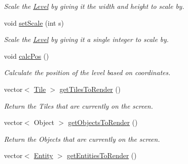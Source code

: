 \begin{DoxyCompactItemize}
\begin{DoxyCompactList}\small\item\em Scale the \hyperlink{classLevel}{Level} by giving it the width and height to scale by. \end{DoxyCompactList}\item 
void \hyperlink{classLevel_af6fe8bc2dd6623fcbaa739403a239d77}{set\+Scale} (int s)\hypertarget{classLevel_af6fe8bc2dd6623fcbaa739403a239d77}{}\label{classLevel_af6fe8bc2dd6623fcbaa739403a239d77}

\begin{DoxyCompactList}\small\item\em Scale the \hyperlink{classLevel}{Level} by giving it a single integer to scale by. \end{DoxyCompactList}\item 
void \hyperlink{classLevel_a02e915f95e181dcfe95553e923a73a39}{calc\+Pos} ()\hypertarget{classLevel_a02e915f95e181dcfe95553e923a73a39}{}\label{classLevel_a02e915f95e181dcfe95553e923a73a39}

\begin{DoxyCompactList}\small\item\em Calculate the position of the level based on coordinates. \end{DoxyCompactList}\item 
vector$<$ \hyperlink{classTile}{Tile} $>$ \hyperlink{classLevel_ade9e45f70f2f3f81c120bb161f87218f}{get\+Tiles\+To\+Render} ()\hypertarget{classLevel_ade9e45f70f2f3f81c120bb161f87218f}{}\label{classLevel_ade9e45f70f2f3f81c120bb161f87218f}

\begin{DoxyCompactList}\small\item\em Return the Tiles that are currently on the screen. \end{DoxyCompactList}\item 
vector$<$ Object $>$ \hyperlink{classLevel_a80d185e702151c5b5764c1cadcd9064d}{get\+Objects\+To\+Render} ()\hypertarget{classLevel_a80d185e702151c5b5764c1cadcd9064d}{}\label{classLevel_a80d185e702151c5b5764c1cadcd9064d}

\begin{DoxyCompactList}\small\item\em Return the Objects that are currently on the screen. \end{DoxyCompactList}\item 
vector$<$ \hyperlink{classEntity}{Entity} $>$ \hyperlink{classLevel_a1a95e314e19e1fdba6850e9aa8da856e}{get\+Entities\+To\+Render} ()\hypertarget{classLevel_a1a95e314e19e1fdba6850e9aa8da856e}{}\label{classLevel_a1a95e314e19e1fdba6850e9aa8da856e}


\end{DoxyCompactItemize}
